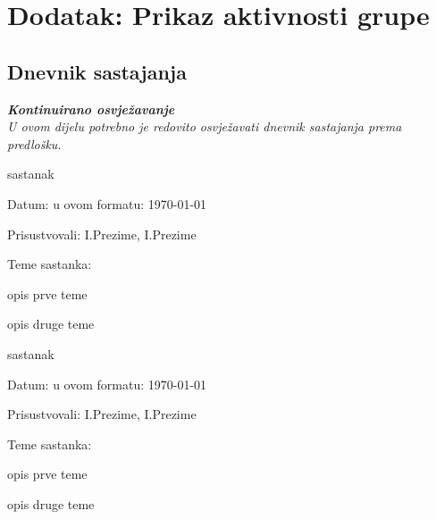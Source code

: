 \chapter*{Dodatak: Prikaz aktivnosti grupe}
		
		\section*{Dnevnik sastajanja}
		
		\textbf{\textit{Kontinuirano osvježavanje}}\\
		
		 \textit{U ovom dijelu potrebno je redovito osvježavati dnevnik sastajanja prema predlošku.}
		
		\begin{packed_enum}
			\item  sastanak
			
			\item[] \begin{packed_item}
				\item Datum: u ovom formatu: \today
				\item Prisustvovali: I.Prezime, I.Prezime
				\item Teme sastanka:
				\begin{packed_item}
					\item  opis prve teme
					\item  opis druge teme
				\end{packed_item}
			\end{packed_item}
			
			\item  sastanak
			\item[] \begin{packed_item}
				\item Datum: u ovom formatu: \today
				\item Prisustvovali: I.Prezime, I.Prezime
				\item Teme sastanka:
				\begin{packed_item}
					\item  opis prve teme
					\item  opis druge teme
				\end{packed_item}
			\end{packed_item}
			
			
		\end{packed_enum}
		
